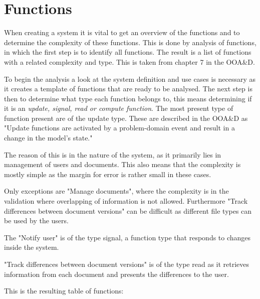 \section{Functions}
When creating a system it is vital to get an overview of the functions and to determine the complexity of these functions. This is done by analysis of functions, in which the first step is to identify all functions. The result is a list of functions with a related complexity and type. This is taken from chapter 7 in the OOA\&D.\citep[ch.~7]{Rod-Aalborg}

To begin the analysis a look at the system definition and use cases is necessary as it creates a template of functions that are ready to be analysed. The next step is then to determine what type each function belongs to, this means determining if it is an \textit{update, signal, read or compute function}. The most present type of function present are of the update type. These are described in the OOA\&D as "Update functions are activated by a problem-domain event and result in a change in the model's state."\citep[p.~140]{Rod-Aalborg}


The reason of this is in the nature of the system, as it primarily lies in management of users and documents. This also means that the complexity is mostly simple as the margin for error is rather small in these cases. 

Only exceptions are "Manage documents", where the complexity is in the validation where overlapping of information is not allowed. Furthermore "Track differences between document versions" can be difficult as different file types can be used by the users.

The "Notify user" is of the type signal, a function type that responds to changes inside the system.

"Track differences between document versions" is of the type read as it retrieves information from each document and presents the differences to the user.

This is the resulting table of functions:

